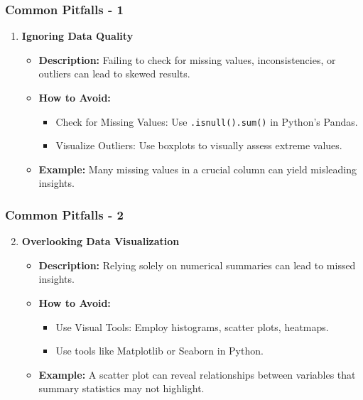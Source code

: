 \documentclass[aspectratio=169]{beamer}
\begin{document}
\begin{frame}
    \frametitle{Common Pitfalls - 1}
    \begin{enumerate}
        \item \textbf{Ignoring Data Quality}
        \begin{itemize}
            \item \textbf{Description:} Failing to check for missing values, inconsistencies, or outliers can lead to skewed results.
            \item \textbf{How to Avoid:}
            \begin{itemize}
                \item Check for Missing Values: Use \texttt{.isnull().sum()} in Python's Pandas.
                \item Visualize Outliers: Use boxplots to visually assess extreme values.
            \end{itemize}
            \item \textbf{Example:} Many missing values in a crucial column can yield misleading insights.
        \end{itemize}
    \end{enumerate}
\end{frame}

\begin{frame}
    \frametitle{Common Pitfalls - 2}
    \begin{enumerate}
        \setcounter{enumi}{1} %
        \item \textbf{Overlooking Data Visualization}
        \begin{itemize}
            \item \textbf{Description:} Relying solely on numerical summaries can lead to missed insights.
            \item \textbf{How to Avoid:}
            \begin{itemize}
                \item Use Visual Tools: Employ histograms, scatter plots, heatmaps.
                \item Use tools like Matplotlib or Seaborn in Python.
            \end{itemize}
            \item \textbf{Example:} A scatter plot can reveal relationships between variables that summary statistics may not highlight.
        \end{itemize}
    \end{enumerate}
\end{frame}
\end{document}
